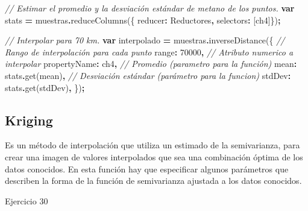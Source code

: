 \documentclass[
  12pt,
  letterpaper,
  twoside]{book}
\newenvironment{Shaded}{\begin{snugshade}}{\end{snugshade}}
\newcommand{\CommentTok}[1]{\textcolor[rgb]{0.56,0.35,0.01}{\textit{#1}}}
\newcommand{\DataTypeTok}[1]{\textcolor[rgb]{0.13,0.29,0.53}{#1}}
\newcommand{\DecValTok}[1]{\textcolor[rgb]{0.00,0.00,0.81}{#1}}
\newcommand{\FunctionTok}[1]{\textcolor[rgb]{0.00,0.00,0.00}{#1}}
\newcommand{\KeywordTok}[1]{\textcolor[rgb]{0.13,0.29,0.53}{\textbf{#1}}}
\newcommand{\NormalTok}[1]{#1}
\newcommand{\OperatorTok}[1]{\textcolor[rgb]{0.81,0.36,0.00}{\textbf{#1}}}
\newcommand{\StringTok}[1]{\textcolor[rgb]{0.31,0.60,0.02}{#1}}
\begin{document}
\begin{Shaded}
\begin{Highlighting}[]
\CommentTok{// Estimar el promedio y la desviación estándar de metano de los puntos.}
\KeywordTok{var}\NormalTok{ stats }\OperatorTok{=}\NormalTok{ muestras}\OperatorTok{.}\FunctionTok{reduceColumns}\NormalTok{(\{}
  \DataTypeTok{reducer}\OperatorTok{:}\NormalTok{ Reductores}\OperatorTok{,}
  \DataTypeTok{selectors}\OperatorTok{:}\NormalTok{ [}\StringTok{\textquotesingle{}ch4\textquotesingle{}}\NormalTok{]\})}\OperatorTok{;}

\CommentTok{// Interpolar para 70 km.}
\KeywordTok{var}\NormalTok{ interpolado }\OperatorTok{=}\NormalTok{ muestras}\OperatorTok{.}\FunctionTok{inverseDistance}\NormalTok{(\{}
  \CommentTok{// Rango de interpolación para cada punto}
  \DataTypeTok{range}\OperatorTok{:} \DecValTok{70000}\OperatorTok{,} 
  \CommentTok{// Atributo numerico a interpolar}
  \DataTypeTok{propertyName}\OperatorTok{:} \StringTok{\textquotesingle{}ch4\textquotesingle{}}\OperatorTok{,} 
  \CommentTok{// Promedio (parametro para la función)}
  \DataTypeTok{mean}\OperatorTok{:}\NormalTok{ stats}\OperatorTok{.}\FunctionTok{get}\NormalTok{(}\StringTok{\textquotesingle{}mean\textquotesingle{}}\NormalTok{)}\OperatorTok{,} 
  \CommentTok{// Desviación estándar (parámetro para la funcion)}
  \DataTypeTok{stdDev}\OperatorTok{:}\NormalTok{ stats}\OperatorTok{.}\FunctionTok{get}\NormalTok{(}\StringTok{\textquotesingle{}stdDev\textquotesingle{}}\NormalTok{)}\OperatorTok{,} 
\NormalTok{  \})}\OperatorTok{;} 
\end{Highlighting}
\end{Shaded}

\hypertarget{kriging}{%
\subsection{Kriging}\label{kriging}}

Es un método de interpolación que utiliza un estimado de la semivarianza, para crear una imagen de valores interpolados que sea una combinación óptima de los datos conocidos. En esta función hay que especificar algunos parámetros que describen la forma de la función de semivarianza ajustada a los datos conocidos.

Ejercicio 30
\end{document}
